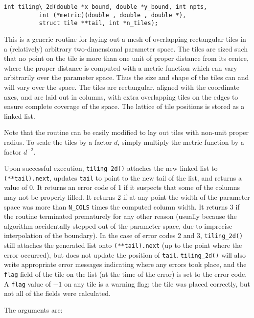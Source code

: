 \begin{verbatim}
int tiling\_2d(double *x_bound, double *y_bound, int npts,
	      int (*metric)(double , double , double *),
	      struct tile **tail, int *n_tiles);
\end{verbatim}

This is a generic routine for laying out a mesh of overlapping
rectangular tiles in a (relatively) arbitrary two-dimensional
parameter space.  The tiles are sized such that no point on the tile
is more than one unit of proper distance from its centre, where the
proper distance is computed with a metric function which can vary
arbitrarily over the parameter space.  Thus the size and shape of the
tiles can and will vary over the space.  The tiles are rectangular,
aligned with the coordinate axes, and are laid out in columns, with
extra overlapping tiles on the edges to ensure complete coverage of
the space.  The lattice of tile positions is stored as a linked list.

Note that the routine can be easily modified to lay out tiles with
non-unit proper radius.  To scale the tiles by a factor $d$, simply
multiply the metric function by a factor $d^{-2}$.

Upon successful execution, {\tt tiling\_2d()} attaches the new linked
list to {\tt (**tail).next}, updates {\tt *tail} to point to the new
tail of the list, and returns a value of 0.  It returns an error code
of 1 if it suspects that some of the columns may not be properly
filled.  It returns 2 if at any point the width of the parameter space
was more than {\tt N\_COLS} times the computed column width.  It
returns 3 if the routine terminated prematurely for any other reason
(usually because the algorithm accidentally stepped out of the
parameter space, due to imprecise interpolation of the boundary).  In
the case of error codes 2 and 3, {\tt tiling\_2d()} still attaches the
generated list onto {\tt (**tail).next} (up to the point where the
error occurred), but does not update the position of {\tt *tail}.
{\tt tiling\_2d()} will also write appropriate error messages
indicating where any errors took place, and the {\tt flag} field of
the tile on the list (at the time of the error) is set to the error
code.  A {\tt flag} value of $-1$ on any tile is a warning flag; the
tile was placed correctly, but not all of the fields were calculated.

The arguments are:

